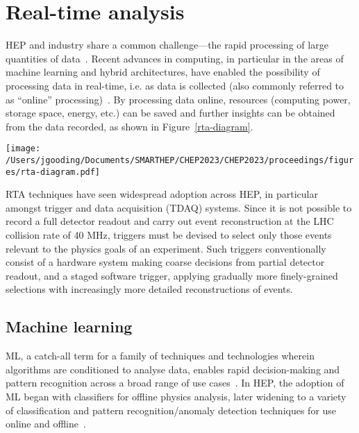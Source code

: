 \section{Real-time analysis}
\label{rta}
HEP and industry share a common challenge—the rapid processing of large quantities of data~\cite{hu-big-data}. Recent advances in computing, in particular in the areas of machine learning and hybrid architectures, have enabled the possibility of processing data in real-time, i.e. as data is collected (also commonly referred to as ``online'' processing)~\cite{real-time-computing}. By processing data online, resources (computing power, storage space, energy, etc.) can be saved and further insights can be obtained from the data recorded, as shown in Figure~\ref{rta-diagram}.

\begin{figure*}[h!]
    \centering
    \texttt{[image: /Users/jgooding/Documents/SMARTHEP/CHEP2023/CHEP2023/proceedings/figures/rta-diagram.pdf]}
    \caption{Traditional and RTA approaches to data processing. Traditional approaches rely on recording all data and processing this offline; in RTA, data is processed as it is produced, recording only the relevant portions, enabling greater volumes of processed data to be stored.}
    \label{rta-diagram}
\end{figure*}

RTA techniques have seen widespread adoption across HEP, in particular amongst trigger and data acquisition (TDAQ) systems. Since it is not possible to record a full detector readout and carry out event reconstruction at the LHC collision rate of {40}{ MHz}, triggers must be devised to select only those events relevant to the physics goals of an experiment. Such triggers conventionally consist of a hardware system making coarse decisions from partial detector readout, and a staged software trigger, applying gradually more finely-grained selections with increasingly more detailed reconstructions of events.

\subsection{Machine learning}
\label{machine-learning}
ML, a catch-all term for a family of techniques and technologies wherein algorithms are conditioned to analyse data, enables rapid decision-making and pattern recognition across a broad range of use cases~\cite{intro-ml}. In HEP, the adoption of ML began with classifiers for offline physics analysis, later widening to a variety of classification and pattern recognition/anomaly detection techniques for use online and offline~\cite{albertsson-ml}.

